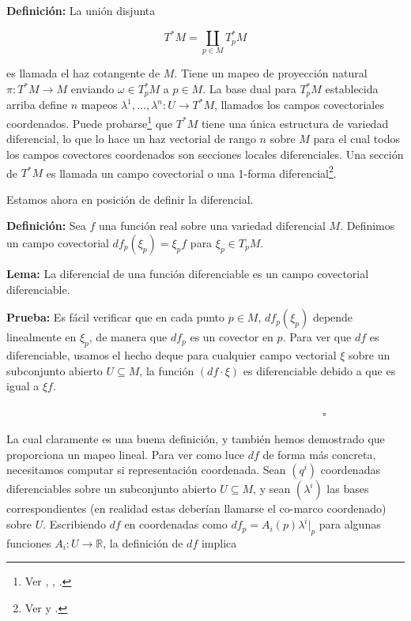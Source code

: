 \documentclass[a4paper,10pt]{article}
\numberwithin{equation}{section}
\newcommand{\definicion}{\textbf{Definición: }}
\newcommand{\lema}{\textbf{Lema: }}
\newcommand{\prueba}{\textbf{Prueba: }}
\begin{document}
\vspace{.3cm}

\definicion La unión disjunta 

\begin{equation}
 T^*M =  \underset{p \in M}{\coprod} T^*_p M
\end{equation}

es llamada el haz cotangente de $M$. Tiene un mapeo de proyección natural 
$\pi: T^* M \rightarrow M$ enviando $\omega \in T^*_p M$ a $p \in M$. La base dual 
para $T^*_p M$ establecida arriba define $n$ mapeos $\lambda^1,\dots,\lambda^n: 
U \rightarrow T^*M$, llamados los campos covectoriales coordenados. Puede probarse\footnote{
Ver \cite{curtis}, \cite{lee}, \cite{kosinski}.} que $T^*M$ tiene una única 
estructura de variedad diferencial, lo que lo hace un haz vectorial de rango $n$ 
sobre $M$ para el cual todos los campos covectores coordenados son secciones 
locales diferenciales. Una sección de $T^* M$ es llamada un campo covectorial 
o una 1-forma diferencial\footnote{Ver \cite{lee} y \cite{torres}.}.

\vspace{.3cm}

Estamos ahora en posición de definir la diferencial.

\vspace{.3cm}

\definicion Sea $f$ una función real sobre una variedad diferencial $M$. Definimos 
un campo covectorial $df_p(\xi_p) = \xi_p f$ para $\xi_p \in T_p M$. 

\vspace{.3cm}

\lema La diferencial de una función diferenciable es un campo covectorial diferenciable.

\vspace{.3cm}

\prueba Es fácil verificar que en cada punto $p \in M$, $df_p(\xi_p)$ depende linealmente 
en $\xi_p$, de manera que $df_p$ es un covector en $p$. Para ver que $df$ es diferenciable, 
usamos el hecho deque para cualquier campo vectorial $\xi$ sobre un subconjunto 
abierto $U \subseteq M$, la función $(df \cdot \xi)$ es diferenciable debido a que 
es igual a $\xi f$.

$\hspace{12cm} \square$

La cual claramente es una buena definición, y también hemos demostrado que proporciona 
un mapeo lineal. Para ver como luce $df$ de forma más concreta, necesitamos computar si representación 
coordenada. Sean $(q^i)$ coordenadas diferenciables sobre un subconjunto abierto 
$U \subseteq M$, y sean $(\lambda^i)$ las bases correspondientes (en realidad 
estas deberían llamarse el co-marco coordenado) sobre $U$. Escribiendo $df$ en 
coordenadas como $df_p = A_i(p)\lambda^i|_p$ para algunas funciones $A_i:U\rightarrow \mathbb{R}$, 
la definición de $df$ implica 
\end{document}
